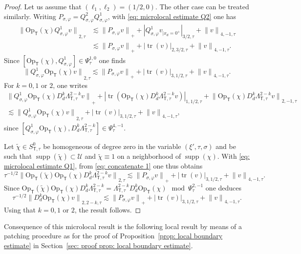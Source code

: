 \documentclass[JEP,XML,SOM,Unicode,published]{cedram}
\theoremstyle{plain}
\theoremstyle{definition}
\newcommand{\nhd}{neighborhood\xspace}
\newcommand{\tchi}{\tilde{\chi}}
\newcommand{\U}{\mathscr U}
\newcommand{\br}{\ensuremath{_{|x_d=0^+}}}
\newcommand{\Opt}{\ensuremath{\mathrm{Op}_{\scriptscriptstyle{\mathsf{T}}}}}
\newcommand{\Norm}[2]{{\| #1 \|}_{#2}}
\newcommand{\Normsc}[2]{{\| #1 \|}_{#2, \tau}}
\newcommand{\normsc}[2]{{| #1 |}_{#2, \tau}}
\newcommand{\Lsct}{\Lambda_{{\scriptscriptstyle{\mathsf T}},\tau}}
\newcommand{\Psisc}{\Psi_\tau}
\newcommand{\Ssct}{S_{{\scriptscriptstyle{\mathsf T}},\tau}}
\newcommand{\Pconj}{P_{\sigma,\varphi}}
\newcommand{\Qconj}{Q_{\sigma,\varphi}}
\DeclareMathOperator{\supp}{supp}
\DeclareMathOperator{\trace}{tr}
\begin{document}
\begin{proof}
Let us assume that $(\ell_1,\ell_2) = (1/2,0)$. The other case can be
treated similarly. Writing $\Pconj =\Qconj^2 \Qconj^1$, with \eqref{eq: microlocal estimate Q2} one has
\begin{align*}
\Normsc{\Opt (\chi) \Qconj^1 v}{2}
&\lesssim
\Norm{ \Pconj v}{+}
+\normsc{\Qconj^1 v\br}{3/2}
+\Normsc{v}{4,-1}\\
&\lesssim
\Norm{\Pconj v}{+}
+\normsc{\trace (v)}{2,3/2}
+\Normsc{v}{4,-1}.
\end{align*}
Since $[\Opt (\chi), \Qconj^1 ] \in \Psisc^{1,0}$ one finds
\begin{equation}
\label{eq: concatenate 1}
\Normsc{\Qconj^1 \Opt (\chi) v}{2}
\lesssim
\Norm{\Pconj v }{+}
+\normsc{\trace (v)}{3,1/2}
+\Normsc{v}{4,-1}.
\end{equation}
For $k=0,1$ or $2$, one writes
\begin{multline*}
\Norm{\Qconj^1 \Opt (\chi) D_d^k \Lsct^{2-k} v}{+}
+ \normsc{\trace (\Opt (\chi) D_d^k \Lsct^{2-k} v)}{1,1/2}
+ \Normsc{\Opt (\chi) D_d^k \Lsct^{2-k} v}{2,-1}\\
\lesssim
\Normsc{\Qconj^1 \Opt (\chi) v}{2}
+ \normsc{\trace (v)}{3,1/2}
+ \Normsc{v}{4,-1},
\end{multline*}
since $[\Qconj^1 \Opt (\chi), D_d^k\Lsct^{2-k} ] \in \Psisc^{4,-1}$.

Let $\tchi\in \Ssct^0$ be homogeneous of degree zero
in the variable $(\xi',\tau,\sigma)$ and be such that
$\supp(\tchi)\subset\U$ and
$\tchi\equiv 1$ on a \nhd of $\supp(\chi)$.
With \eqref{eq: microlocal estimate Q1}, from \eqref{eq: concatenate
1} one thus obtains
\begin{equation*}
\tau^{-1/2}\Normsc{\Opt(\tchi)\Opt (\chi) D_d^k\Lsct^{2-k} v}{2}
\lesssim
\Norm{\Pconj v }{+}
+\normsc{\trace (v)}{3,1/2}
+\Normsc{v}{4,-1}.
\end{equation*}
Since $\Opt(\tchi)\Opt (\chi) D_d^k\Lsct^{2-k} =\Lsct^{2-k} D_d^k \Opt (\chi) \mod
\Psisc^{2,-1}$ one deduces
\begin{equation*}
\tau^{-1/2}\Normsc{D_d^k\Opt (\chi) v}{2,2-k}
\lesssim
\Norm{\Pconj v}{+}
+\normsc{\trace (v)}{3,1/2}
+\Normsc{v}{4,-1}.
\end{equation*}
Using that $k=0,1$ or $2$, the result follows.
\end{proof}

Consequence of this microlocal result is the following local result
by means of a patching procedure as for the proof of
Proposition~\ref{prop: local boundary estimate} in Section~\ref{sec: proof prop: local boundary estimate}.
\end{document}
